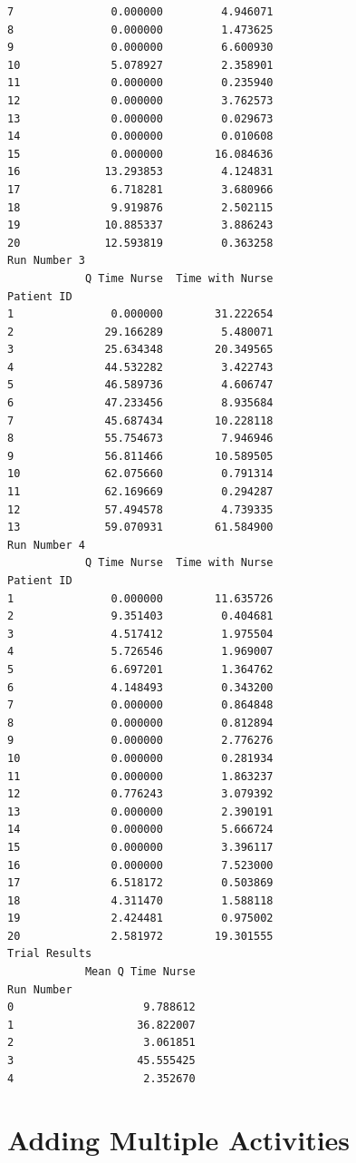 \documentclass[
  letterpaper,
  DIV=11,
  numbers=noendperiod]{scrreprt}
\begin{document}
\begin{verbatim}
7               0.000000         4.946071
8               0.000000         1.473625
9               0.000000         6.600930
10              5.078927         2.358901
11              0.000000         0.235940
12              0.000000         3.762573
13              0.000000         0.029673
14              0.000000         0.010608
15              0.000000        16.084636
16             13.293853         4.124831
17              6.718281         3.680966
18              9.919876         2.502115
19             10.885337         3.886243
20             12.593819         0.363258
Run Number 3
            Q Time Nurse  Time with Nurse
Patient ID                               
1               0.000000        31.222654
2              29.166289         5.480071
3              25.634348        20.349565
4              44.532282         3.422743
5              46.589736         4.606747
6              47.233456         8.935684
7              45.687434        10.228118
8              55.754673         7.946946
9              56.811466        10.589505
10             62.075660         0.791314
11             62.169669         0.294287
12             57.494578         4.739335
13             59.070931        61.584900
Run Number 4
            Q Time Nurse  Time with Nurse
Patient ID                               
1               0.000000        11.635726
2               9.351403         0.404681
3               4.517412         1.975504
4               5.726546         1.969007
5               6.697201         1.364762
6               4.148493         0.343200
7               0.000000         0.864848
8               0.000000         0.812894
9               0.000000         2.776276
10              0.000000         0.281934
11              0.000000         1.863237
12              0.776243         3.079392
13              0.000000         2.390191
14              0.000000         5.666724
15              0.000000         3.396117
16              0.000000         7.523000
17              6.518172         0.503869
18              4.311470         1.588118
19              2.424481         0.975002
20              2.581972        19.301555
Trial Results
            Mean Q Time Nurse
Run Number                   
0                    9.788612
1                   36.822007
2                    3.061851
3                   45.555425
4                    2.352670
\end{verbatim}

\chapter{Adding Multiple Activities}\label{adding-multiple-activities}
\end{document}
